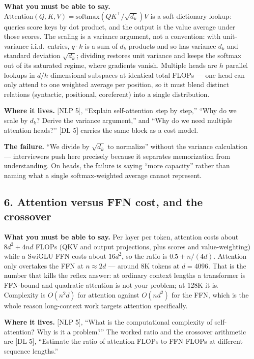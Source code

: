\textbf{What you must be able to say.} $\mathrm{Attention}(Q,K,V) = \mathrm{softmax}(QK^{\top}/\sqrt{d_k})V$ is a soft dictionary lookup: queries score keys by dot product, and the output is the value average under those scores. The scaling is a variance argument, not a convention: with unit-variance i.i.d.\ entries, $q \cdot k$ is a sum of $d_k$ products and so has variance $d_k$ and standard deviation $\sqrt{d_k}$; dividing restores unit variance and keeps the softmax out of its saturated regime, where gradients vanish. Multiple heads are $h$ parallel lookups in $d/h$-dimensional subspaces at identical total FLOPs --- one head can only attend to one weighted average per position, so it must blend distinct relations (syntactic, positional, coreferent) into a single distribution.

\textbf{Where it lives.} [NLP 5], ``Explain self-attention step by step,'' ``Why do we scale by $d_k$? Derive the variance argument,'' and ``Why do we need multiple attention heads?'' [DL 5] carries the same block as a cost model.

\textbf{The failure.} ``We divide by $\sqrt{d_k}$ to normalize'' without the variance calculation --- interviewers push here precisely because it separates memorization from understanding. On heads, the failure is saying ``more capacity'' rather than naming what a single softmax-weighted average cannot represent.

\subsection*{6. Attention versus FFN cost, and the crossover}

\textbf{What you must be able to say.} Per layer per token, attention costs about $8d^2 + 4nd$ FLOPs (QKV and output projections, plus scores and value-weighting) while a SwiGLU FFN costs about $16d^2$, so the ratio is $0.5 + n/(4d)$. Attention only overtakes the FFN at $n \approx 2d$ --- around 8K tokens at $d = 4096$. That is the number that kills the reflex answer: at ordinary context lengths a transformer is FFN-bound and quadratic attention is not your problem; at 128K it is. Complexity is $O(n^2 d)$ for attention against $O(n d^2)$ for the FFN, which is the whole reason long-context work targets attention specifically.

\textbf{Where it lives.} [NLP 5], ``What is the computational complexity of self-attention? Why is it a problem?'' The worked ratio and the crossover arithmetic are [DL 5], ``Estimate the ratio of attention FLOPs to FFN FLOPs at different sequence lengths.''

